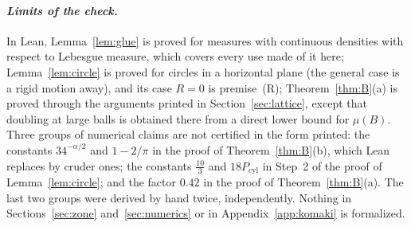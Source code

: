 \documentclass[11pt]{amsart}
\theoremstyle{plain}
\theoremstyle{definition}
\theoremstyle{remark}
\begin{document}
\paragraph{\textit{Limits of the check.}} In Lean, Lemma~\ref{lem:glue} is proved for
measures with continuous densities with respect to Lebesgue measure, which
covers every use made of it here; Lemma~\ref{lem:circle} is proved for
circles in a horizontal plane (the general case is a rigid motion away), and
its case $R=0$ is premise~(R); Theorem~\ref{thm:B}(a) is proved through the
arguments printed in Section~\ref{sec:lattice}, except that doubling at large
balls is obtained there from a direct lower bound for $\mu(B)$. Three
groups of numerical claims are not certified in the form printed: the
constants $34^{-\alpha/2}$ and $1-2/\pi$ in the proof of
Theorem~\ref{thm:B}(b), which Lean replaces by cruder ones; the constants
$\tfrac{10}3$ and $18P_{\mathrm{cyl}}$ in Step~2 of the proof of
Lemma~\ref{lem:circle}; and the factor $0.42$ in the proof of
Theorem~\ref{thm:B}(a). The last two groups were derived by hand twice,
independently. Nothing in Sections~\ref{sec:zone} and~\ref{sec:numerics} or in
Appendix~\ref{app:komaki} is formalized.
\end{document}
